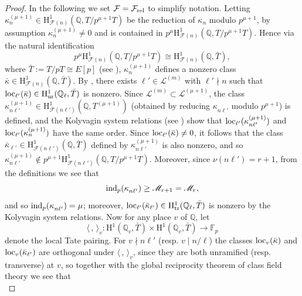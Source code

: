 \documentclass[10pt,reqno]{amsart}
\numberwithin{equation}{section}
\theoremstyle{plain}
\theoremstyle{definition}
\theoremstyle{definition}
\theoremstyle{plain}
\theoremstyle{plain}
\theoremstyle{plain}
\theoremstyle{plain}
\theoremstyle{plain}
\theoremstyle{plain}
\newcommand{\Q}{\mathbb{Q}}
\newcommand{\Fcal}{\mathcal{F}}
\newcommand{\rH}{\mathrm{H}}
\begin{document}
\begin{proof}
In the following we set $\mathcal{F}=\mathcal{F}_{\rm rel}$ to simplify notation. Letting $\kappa_n^{(\mu+1)}\in\rH^1_{\Fcal(n)}(\Q,T/p^{\mu+1}T)$ be the reduction of $\kappa_n^{}$ modulo $p^{\mu+1}$, by assumption $\kappa_n^{(\mu+1)}\neq 0$  and is contained in $p^\mu\rH^1_{\Fcal(n)}(\Q,T/p^{\mu+1}T)$. Hence via the natural identification
\[
p^\mu\rH^1_{\Fcal(n)}(\Q,T/p^{\mu+1}T)\cong \rH^1_{\Fcal(n)}(\Q,\bar{T}),
\]
where $\bar{T}:=T/pT\cong E[p]$ (see \cite[Lem.~3.5.4]{mazrub}), $\kappa_n^{(\mu+1)}$ defines a nonzero class $\bar{\kappa}\in\rH^1_{\Fcal(n)}(\Q,\bar{T})$. By \cite[Prop.~3.6.1]{mazrub}, there exists  $\ell'\in\mathcal{L}^{(m)}$ with $\ell'\nmid n$ such that ${\rm loc}_{\ell'}(\bar{\kappa})\in \rH^1_{\rm ur}(\Q_\ell,\bar{T})$ is nonzero. Since $\mathcal{L}^{(m)}\subset\mathcal{L}^{(\mu+1)}$, the class $\kappa_{n\ell'}^{(\mu+1)}\in\rH^1_{\Fcal(n\ell')}(\Q,T^{(\mu+1)})$ (obtained by reducing $\kappa_{n\ell'}^{}$ modulo $p^{\mu+1}$) is defined, 
and the Kolyvagin system relations (see \cite[Def.~3.1.3]{mazrub}) show that ${\rm loc}_{\ell'}(\kappa_{n\ell'}^{(\mu+1)})$ and ${\rm loc}_{\ell'}(\kappa_{n}^{(\mu+1)})$ have the same order. Since ${\rm loc}_{\ell'}(\bar{\kappa})\neq 0$, it follows that the class $\bar{\kappa}_{\ell'}\in\rH^1_{\Fcal(n\ell')}(\Q,\bar{T})$ defined by $\kappa_{n\ell'}^{(\mu+1)}$ is also nonzero, and so  $\kappa_{n\ell'}^{(\mu+1)}\notin p^{\mu+1}\rH^1_{\Fcal(n\ell')}(\Q,T/p^{\mu+1}T)$. Moreover, since $\nu(n\ell')=r+1$, from the definitions we see that
\[
{\rm ind}_p(\kappa_{n\ell'}^{})\geq \mathscr{M}_{r+1}=\mathscr{M}_r,%
\]
and so ${\rm ind}_p(\kappa_{n\ell'}^{})=\mu$;  moreover, ${\rm loc}_{\ell'}(\bar{\kappa}_{\ell'})\in \rH^1_{\rm tr}(\Q_\ell,\bar{T})$ is nonzero by the Kolyvagin system relations. Now for any place $v$ of $\Q$, let 
\[
\langle\,,\,\rangle_v:\rH^1(\Q_v,\bar{T})\times \rH^1(\Q_v,\bar{T})\rightarrow\mathbb{F}_p
\]
denote the local Tate pairing. For $v\nmid n\ell'$ (resp. $v\mid n/\ell$) the classes ${\rm loc}_v(\bar{\kappa})$ and ${\rm loc}_v(\bar{\kappa}_{\ell'})$ are orthogonal under $\langle\,,\,\rangle_v$, since they are both unramified (resp. transverse) at $v$, so together with the global reciprocity theorem of class field theory we see that
\begin{equation}\label{eq:rec-ells}

\end{equation}
\end{proof}
\end{document}
